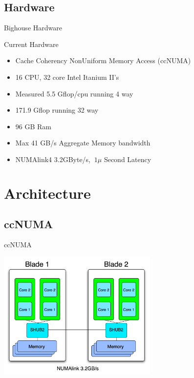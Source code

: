 \documentclass[handout]{beamer}
\begin{document}
  \subsection {Hardware}
  \begin{frame}{Bighouse Hardware}
   \begin{block}{Current Hardware}
   \begin{itemize}
    \item<1->Cache Coherency NonUniform Memory Access (ccNUMA)
    \item<2->16 CPU, 32 core Intel Itanium II's
    \item<3->Measured 5.5 Gflop/cpu running 4 way
    \item<3->171.9 Gflop running 32 way
    \item<4->96 GB Ram
    \item<5->Max 41 GB/s Aggregate Memory bandwidth
    \item<6->NUMAlink4 3.2GByte/s, $~1 \mu$ Second Latency
   \end{itemize}
   \end{block}
  \end{frame}

  \section{Architecture}
  \subsection{ccNUMA}
  \begin{frame}{ccNUMA}
   \begin{center}\includegraphics[height=2.5in]{numa}\end{center}
  \end{frame}
\end{document}
